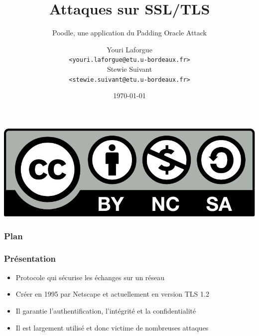 %
%

\usepackage[french]{babel}
\usepackage{listings}
\usepackage{color}

\newcommand{\highlight}[1]{\textcolor{structure.fg}{\bfseries #1}}

\title{Attaques sur SSL/TLS}
\subtitle{Poodle, une application du Padding Oracle Attack}

\author[]{Youri Laforgue\\[-.25em]
        \texttt{\scriptsize <youri.laforgue@etu.u-bordeaux.fr>}\\
        Stewie Suivant\\[-.25em]
        \texttt{\scriptsize <stewie.suivant@etu.u-bordeaux.fr>}}


\date{\today}
 


\lstset{language=C}

\begin{frame}
  \vspace{3.5em}
  \titlepage

  \begin{center}
    \includegraphics[scale=.2]{cc-by-nc-sa.pdf}
  \end{center}
\end{frame}

\begin{frame}
  \frametitle{Plan}
  \tableofcontents[subsectionstyle=hide]
\end{frame}

\begin{frame}
  \frametitle{Présentation}

  \begin{itemize}
  \item Protocole qui sécurise les échanges sur un  réseau
  \item Créer en 1995 par Netscape et actuellement en version TLS 1.2
  \item Il garantie l'authentification, l'intégrité et la confidentialité
  \item Il est largement utilisé et donc victime de nombreuses attaques
  \end{itemize}
\end{frame}

